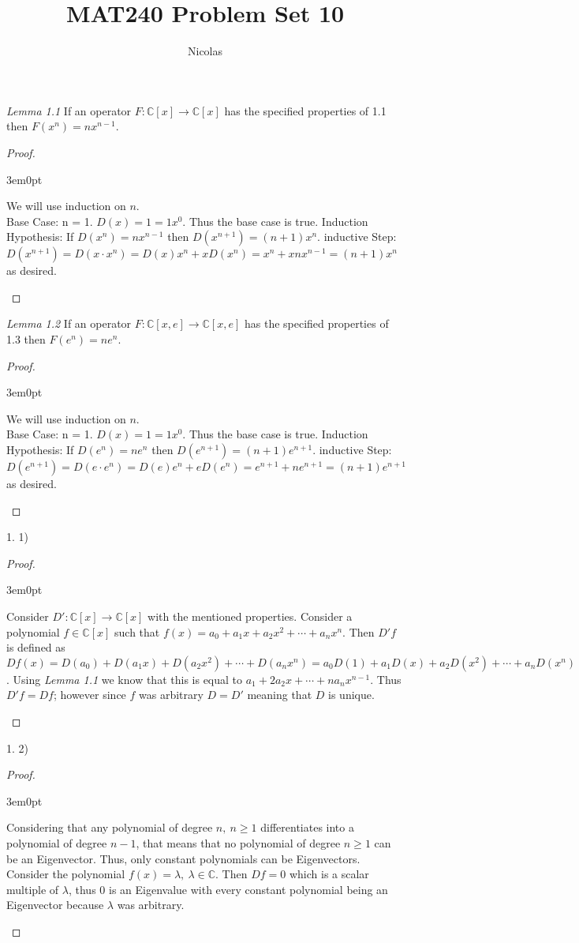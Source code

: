 \documentclass[11pt]{article}
\title{MAT240 Problem Set 10}
\author{Nicolas}
\newcommand{\C}{\mathbb{C}}
\newenvironment{myproof}
{\begin{proof} \begin{adjustwidth}{3em}{0pt}$ $\par\nobreak\ignorespaces}
{\end{adjustwidth} \end{proof}}
\begin{document}
\maketitle
\begin{flushleft}

\textit{Lemma 1.1} If an operator $F: \C[x] \to \C[x]$ has the specified properties of 1.1 then $F(x^n) = nx^{n-1}$.

\begin{myproof}

We will use induction on $n$. \\
Base Case: n = 1. $D(x) = 1 = 1x^0$. Thus the base case is true.
Induction Hypothesis: If $D(x^n) = nx^{n-1}$ then $D(x^{n+1}) = (n+1)x^n$.
inductive Step: $D(x^{n+1}) = D(x \cdot x^n) = D(x)x^n+ xD(x^n) = x^n + xnx^{n-1} = (n+1)x^n$ as desired.

\end{myproof}

\textit{Lemma 1.2} If an operator $F: \C[x,e] \to \C[x,e]$ has the specified properties of 1.3 then $F(e^n) = ne^n$.

\begin{myproof}

We will use induction on $n$. \\
Base Case: n = 1. $D(x) = 1 = 1x^0$. Thus the base case is true.
Induction Hypothesis: If $D(e^n) = ne^n$ then $D(e^{n+1}) = (n+1)e^{n+1}$.
inductive Step: $D(e^{n+1}) = D(e \cdot e^n) = D(e)e^n+ eD(e^n) = e^{n+1} + ne^{n+1} = (n+1)e^{n+1}$ as desired.

\end{myproof}

1. 1)

\begin{myproof}

Consider $D': \C[x] \to \C[x]$ with the mentioned properties. Consider a polynomial $f \in \C[x]$ such that $f(x) = a_0 + a_1x + a_2x^2 + \cdots + a_nx^n$. Then $D'f$ is defined as $Df(x) = D(a_0) + D(a_1x) + D(a_2x^2) + \cdots + D(a_nx^n) = a_0D(1) + a_1D(x) + a_2D(x^2) + \cdots + a_nD(x^n)$. Using \textit{Lemma 1.1} we know that this is equal to $a_1 + 2a_2x + \cdots + na_nx^{n-1}$. Thus $D'f = Df$; however since $f$ was arbitrary $D = D'$ meaning that $D$ is unique.
\end{myproof}

1. 2)

\begin{myproof}

Considering that any polynomial of degree $n, \ n \geq 1$ differentiates into a polynomial of degree $n-1$, that means that no polynomial of degree $n \geq 1$ can be an Eigenvector. Thus, only constant polynomials can be Eigenvectors. Consider the polynomial $f(x) = \lambda, \ \lambda \in \C$. Then $Df = 0$ which is a scalar multiple of $\lambda$, thus 0 is an Eigenvalue with every constant polynomial being an Eigenvector because $\lambda$ was arbitrary.


\end{myproof}
\end{flushleft}
\end{document}
